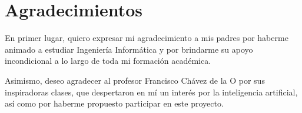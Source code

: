 \chapter*{Agradecimientos} 

En primer lugar, quiero expresar mi agradecimiento a mis padres por haberme animado a estudiar Ingeniería Informática y por brindarme su apoyo incondicional a lo largo de toda mi formación académica.

\vspace{5mm}

Asimismo, deseo agradecer al profesor Francisco Chávez de la O por sus inspiradoras clases, que despertaron en mí un interés por la inteligencia artificial, así como por haberme propuesto participar en este proyecto.
